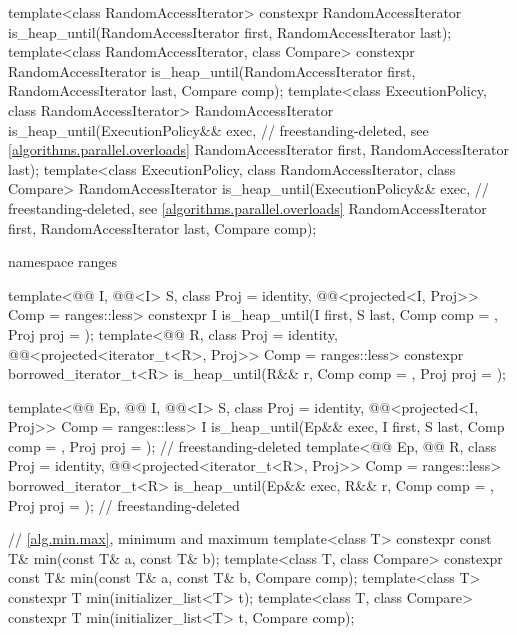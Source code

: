 \begin{codeblock}
{  template<class RandomAccessIterator>
    constexpr RandomAccessIterator
      is_heap_until(RandomAccessIterator first, RandomAccessIterator last);
  template<class RandomAccessIterator, class Compare>
    constexpr RandomAccessIterator
      is_heap_until(RandomAccessIterator first, RandomAccessIterator last,
                    Compare comp);
  template<class ExecutionPolicy, class RandomAccessIterator>
    RandomAccessIterator
      is_heap_until(ExecutionPolicy&& exec,                     // freestanding-deleted, see \ref{algorithms.parallel.overloads}
                    RandomAccessIterator first, RandomAccessIterator last);
  template<class ExecutionPolicy, class RandomAccessIterator, class Compare>
    RandomAccessIterator
      is_heap_until(ExecutionPolicy&& exec,                     // freestanding-deleted, see \ref{algorithms.parallel.overloads}
                    RandomAccessIterator first, RandomAccessIterator last,
                    Compare comp);

  namespace ranges {
    template<@@ I, @@<I> S, class Proj = identity,
             @@<projected<I, Proj>> Comp = ranges::less>
      constexpr I is_heap_until(I first, S last, Comp comp = {}, Proj proj = {});
    template<@@ R, class Proj = identity,
             @@<projected<iterator_t<R>, Proj>> Comp = ranges::less>
      constexpr borrowed_iterator_t<R>
        is_heap_until(R&& r, Comp comp = {}, Proj proj = {});

    template<@@ Ep, @@ I, @@<I> S,
             class Proj = identity,
             @@<projected<I, Proj>> Comp = ranges::less>
      I is_heap_until(Ep&& exec, I first, S last, Comp comp = {},
                      Proj proj = {});                                      // freestanding-deleted
    template<@@ Ep, @@ R, class Proj = identity,
             @@<projected<iterator_t<R>, Proj>> Comp = ranges::less>
      borrowed_iterator_t<R>
        is_heap_until(Ep&& exec, R&& r, Comp comp = {}, Proj proj = {});    // freestanding-deleted
  }

  // \ref{alg.min.max}, minimum and maximum
  template<class T> constexpr const T& min(const T& a, const T& b);
  template<class T, class Compare>
    constexpr const T& min(const T& a, const T& b, Compare comp);
  template<class T>
    constexpr T min(initializer_list<T> t);
  template<class T, class Compare>
    constexpr T min(initializer_list<T> t, Compare comp);

}
\end{codeblock}
